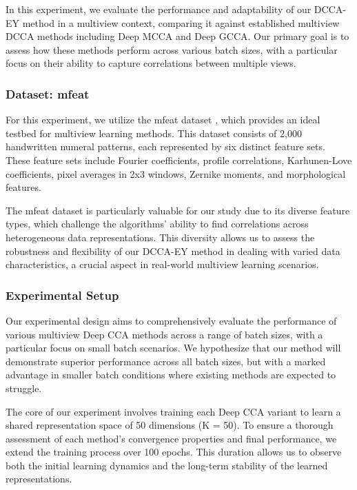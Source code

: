 In this experiment, we evaluate the performance and adaptability of our DCCA-EY method in a multiview context, comparing it against established multiview DCCA methods including Deep MCCA and Deep GCCA. Our primary goal is to assess how these methods perform across various batch sizes, with a particular focus on their ability to capture correlations between multiple views.

\subsubsection{Dataset: mfeat}

For this experiment, we utilize the mfeat dataset \citep{misc_multiple_features_72}, which provides an ideal testbed for multiview learning methods. This dataset consists of 2,000 handwritten numeral patterns, each represented by six distinct feature sets. These feature sets include Fourier coefficients, profile correlations, Karhunen-Love coefficients, pixel averages in 2x3 windows, Zernike moments, and morphological features.

The mfeat dataset is particularly valuable for our study due to its diverse feature types, which challenge the algorithms' ability to find correlations across heterogeneous data representations. This diversity allows us to assess the robustness and flexibility of our DCCA-EY method in dealing with varied data characteristics, a crucial aspect in real-world multiview learning scenarios.

\subsubsection{Experimental Setup}

Our experimental design aims to comprehensively evaluate the performance of various multiview Deep CCA methods across a range of batch sizes, with a particular focus on small batch scenarios. We hypothesize that our method will demonstrate superior performance across all batch sizes, but with a marked advantage in smaller batch conditions where existing methods are expected to struggle.

The core of our experiment involves training each Deep CCA variant to learn a shared representation space of 50 dimensions (K = 50). To ensure a thorough assessment of each method's convergence properties and final performance, we extend the training process over 100 epochs. This duration allows us to observe both the initial learning dynamics and the long-term stability of the learned representations.

